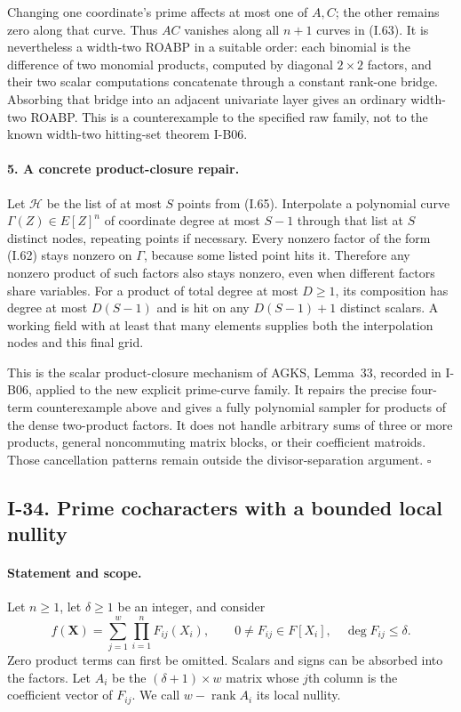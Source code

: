 Changing one coordinate's prime affects at most one of
$A,C$; the other remains zero along that curve.  Thus
$AC$ vanishes along all $n+1$ curves in (I.63).
It is nevertheless a width-two ROABP in a suitable order:
each binomial is the difference of two monomial products,
computed by diagonal $2\times2$ factors, and their two
scalar computations concatenate through a constant
rank-one bridge.  Absorbing that bridge into an adjacent
univariate layer gives an ordinary width-two ROABP.
This is a counterexample to the specified raw family,
not to the known width-two hitting-set theorem I-B06.

\paragraph{5. A concrete product-closure repair.}
Let $\mathcal H$ be the list of at most $S$ points from
(I.65).  Interpolate a polynomial curve
$\Gamma(Z)\in E[Z]^n$ of coordinate degree at most $S-1$
through that list at $S$ distinct nodes, repeating points
if necessary.  Every nonzero factor of the form (I.62)
stays nonzero on $\Gamma$, because some listed point hits it.
Therefore any nonzero product of such factors also stays
nonzero, even when different factors share variables.
For a product of total degree at most $D\ge1$, its
composition has degree at most $D(S-1)$ and is hit on any
$D(S-1)+1$ distinct scalars.  A working field with at least
that many elements supplies both the interpolation nodes
and this final grid.

This is the scalar product-closure mechanism of AGKS,
Lemma~33, recorded in I-B06, applied to the new explicit
prime-curve family.  It repairs the precise four-term
counterexample above and gives a fully polynomial sampler
for products of the dense two-product factors.  It does
not handle arbitrary sums of three or more products,
general noncommuting matrix blocks, or their coefficient
matroids.  Those cancellation patterns remain outside
the divisor-separation argument.
\hfill$\square$


\subsection{I-34. Prime cocharacters with a bounded local nullity}
\label{I-34}

\paragraph{Statement and scope.}
Let $n\ge1$, let $\delta\ge1$ be an integer, and consider
\[
 f(\mathbf X)=\sum_{j=1}^{w}\prod_{i=1}^{n}F_{ij}(X_i),
 \qquad 0\ne F_{ij}\in F[X_i],\quad \deg F_{ij}\le\delta.
 \tag{I.67}
\]
Zero product terms can first be omitted. Scalars and signs can be
absorbed into the factors. Let $A_i$ be the $(\delta+1)\times w$
matrix whose $j$th column is the coefficient vector of $F_{ij}$.
We call $w-\operatorname{rank}A_i$ its local nullity.

